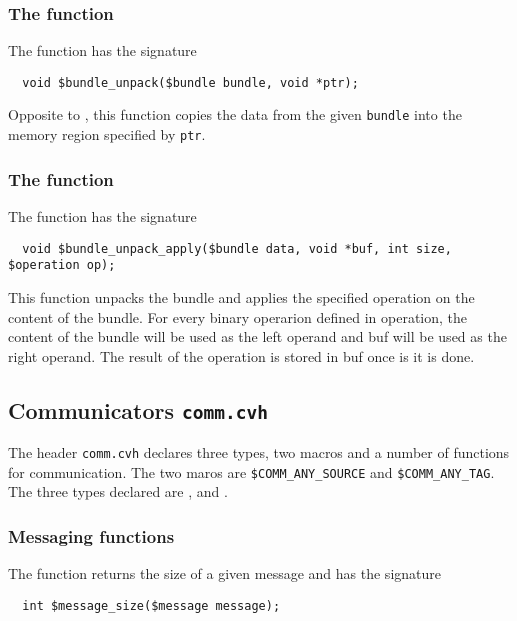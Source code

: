 \subsubsection{The \cbundleunpack{} function}

The \cbundleunpack{} function has the signature
\begin{verbatim}
  void $bundle_unpack($bundle bundle, void *ptr);
\end{verbatim}

Opposite to \cbundlepack, this function copies the data from the given \texttt{bundle} into the memory region specified by \texttt{ptr}. 

\subsubsection{The \cbundleunpackapply{} function}

The \cbundleunpackapply{} function has the signature
\begin{verbatim}
  void $bundle_unpack_apply($bundle data, void *buf, int size, $operation op);
\end{verbatim}

This function unpacks the bundle and applies the specified operation on the content of the bundle. For every binary operarion defined in operation, the  content of the bundle will be used as the left operand and buf will be used as the right operand. The result of the operation is stored in buf once is it is done.


\subsection{Communicators \texttt{comm.cvh}}
\label{subsec:commLibrary}

The header \texttt{comm.cvh} declares three types, two macros and a number of functions for communication. The two maros are \texttt{\$COMM\_ANY\_SOURCE} and \texttt{\$COMM\_ANY\_TAG}. The three types declared are \cmessage, \cgcomm{} and \ccomm. 

\subsubsection{Messaging functions}
\label{subsubsec:messaging}

The function \cmessagesize{} returns the size of a given message and has the signature

\begin{verbatim}
  int $message_size($message message);
\end{verbatim}

